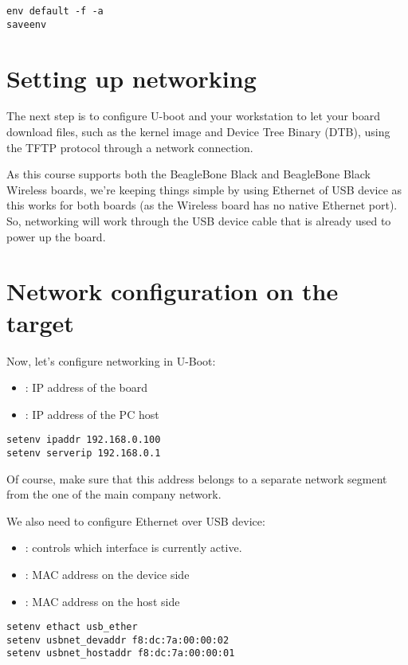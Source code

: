 \begin{verbatim}
env default -f -a
saveenv
\end{verbatim}

\section{Setting up networking}

The next step is to configure U-boot and your workstation to let your
board download files, such as the kernel image and Device Tree Binary
(DTB), using the TFTP protocol through a network connection.

As this course supports both the BeagleBone Black and BeagleBone Black
Wireless boards, we're keeping things simple by using Ethernet of USB
device as this works for both boards (as the Wireless board has no
native Ethernet port). So, networking will work through the USB device
cable that is already used to power up the board.

\section{Network configuration on the target}
Now, let's configure networking in U-Boot:

\begin{itemize}
  \item {}: IP address of the board
  \item {}: IP address of the PC host
\end{itemize}

\begin{verbatim}
setenv ipaddr 192.168.0.100
setenv serverip 192.168.0.1
\end{verbatim}

Of course, make sure that this address belongs to a separate network
segment from the one of the main company network.

We also need to configure Ethernet over USB device:
\begin{itemize}
  \item {}: controls which interface is currently active.
  \item {}: MAC address on the device side
  \item {}: MAC address on the host side  
\end{itemize}

\begin{verbatim}
setenv ethact usb_ether
setenv usbnet_devaddr f8:dc:7a:00:00:02
setenv usbnet_hostaddr f8:dc:7a:00:00:01
\end{verbatim}

